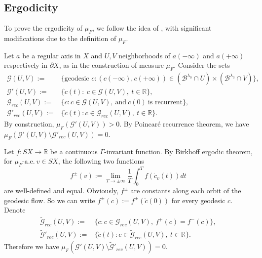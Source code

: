 \documentclass[11pt]{amsart}
\theoremstyle{definition}
\newcommand{\BBB}{\mathcal{B}}
\def\pX{{\partial X}}
\def\l{\lambda}   \def\L{\Lambda}
\def\ae{\text{-a.e.}\ }
\begin{document}
\subsection{Ergodicity}
To prove the ergodicity of $\mu_F$, we follow the idea of \cite{Kn}, with significant modifications due to the definition of $\mu_F$. 

Let $a$ be a regular axis in $X$ and  $U,V$ neighborhoods of $a(-\infty)$ and $a(+\infty)$ respectively in $\pX$, as in the construction of measure $\mu_F$.  Consider the sets
\begin{equation*}
\begin{aligned}
\mathcal{G}(U,V):=&\{\text{geodesic\ } c: (c(-\infty), c(+\infty))\in (\BBB^{\l_0}\cap U)\times (\BBB^{\l_0}\cap V)\},\\
\mathcal{G}'(U,V):=&\{\dot c(t):~ c\in \mathcal{G}(U,V),~t\in\mathbb{R} \},\\
\mathcal{G}_{rec}(U,V):=&\{c : c\in \mathcal{G}(U,V),~\mbox{and} ~\dot{c}(0) ~\mbox{is recurrent}\},\\
\mathcal{G}'_{rec}(U,V):=&\{\dot c(t): c\in \mathcal{G}_{rec}(U,V),~t\in\mathbb{R} \}.
\end{aligned}
\end{equation*}
By construction, $\mu_F(\mathcal{G}'(U,V))>0$. By Poincar\'e recurrence theorem, we have $\mu_F(\mathcal{G}'(U,V)\setminus \mathcal{G}'_{rec}(U,V))=0$.

Let $f:SX \to \mathbb{R}$ be a continuous $\Gamma$-invariant function.
By Birkhoff ergodic theorem,
for $\mu_F \ae v\in SX$, the following two functions
$$f^{\pm}(v):= \lim_{T\rightarrow \pm\infty}\frac{1}{T}\int^{T}_{0}f(\dot c_v(t))dt$$
are well-defined and equal.
Obviously, $f^{\pm}$ are constants along each orbit of the geodesic flow.
So we can write $f^{\pm}(c):=f^{\pm}(\dot c(0))$ for every geodesic $c$.
Denote 
\begin{equation*}
\begin{aligned}
\mathcal{\widetilde{G}}_{rec}(U,V):=&\{c : c \in \mathcal{G}_{rec}(U,V), ~f^+(c)=f^-(c)\},\\
\mathcal{\widetilde{G}}'_{rec}(U,V):=&\{\dot c(t): c\in\mathcal{\widetilde{G}}_{rec}(U,V),~t\in\mathbb{R}\}.
\end{aligned}
\end{equation*}
Therefore we have $\mu_F(\mathcal{G}'(U,V)\setminus \mathcal{\widetilde{G}}'_{rec}(U,V))=0.$
\end{document}
